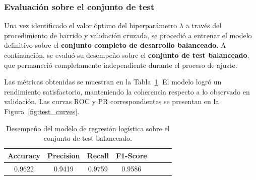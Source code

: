 \documentclass[11pt]{article}
\begin{document}
\subsubsection*{Evaluación sobre el conjunto de test}

Una vez identificado el valor óptimo del hiperparámetro $\lambda$ a través del procedimiento de barrido y validación cruzada, se procedió a entrenar el modelo definitivo sobre el \textbf{conjunto completo de desarrollo balanceado}. A continuación, se evaluó su desempeño sobre el \textbf{conjunto de test balanceado}, que permaneció completamente independiente durante el proceso de ajuste.

Las métricas obtenidas se muestran en la Tabla~\ref{tab:test_metrics}. El modelo logró un rendimiento satisfactorio, manteniendo la coherencia respecto a lo observado en validación. Las curvas ROC y PR correspondientes se presentan en la Figura~\ref{fig:test_curves}.

\begin{table}[H]
    \centering
    \begin{tabular}{lcccccc}
        \toprule
        \textbf{Accuracy} & \textbf{Precision} & \textbf{Recall} & \textbf{F1-Score} \\
        \midrule
        \multicolumn{1}{c}{0.9622} & \multicolumn{1}{c}{0.9419} & \multicolumn{1}{c}{0.9759} & \multicolumn{1}{c}{0.9586} \\
        \bottomrule
    \end{tabular}
    \caption{Desempeño del modelo de regresión logística sobre el conjunto de test balanceado.}
    \label{tab:test_metrics}
\end{table}
\end{document}
